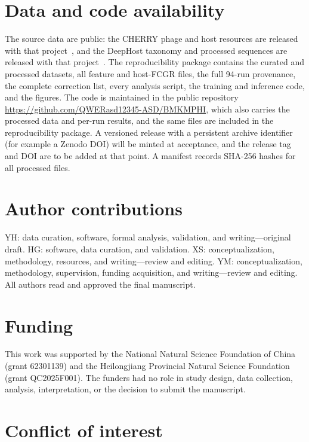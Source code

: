 \documentclass[utf8]{FrontiersinVancouver}
\begin{document}
\section*{Data and code availability}

The source data are public: the CHERRY phage and host resources are released with that project~\citep{shang2022cherry}, and the DeepHost taxonomy and processed sequences are released with that project~\citep{wang2022deephost}. The reproducibility package contains the curated and processed datasets, all feature and host-FCGR files, the full 94-run provenance, the complete correction list, every analysis script, the training and inference code, and the figures. The code is maintained in the public repository \url{https://github.com/QWERasd12345-ASD/BMKMPHI}, which also carries the processed data and per-run results, and the same files are included in the reproducibility package. A versioned release with a persistent archive identifier (for example a Zenodo DOI) will be minted at acceptance, and the release tag and DOI are to be added at that point. A manifest records SHA-256 hashes for all processed files.

\section*{Author contributions}

YH: data curation, software, formal analysis, validation, and writing---original draft. HG: software, data curation, and validation. XS: conceptualization, methodology, resources, and writing---review and editing. YM: conceptualization, methodology, supervision, funding acquisition, and writing---review and editing. All authors read and approved the final manuscript.

\section*{Funding}

This work was supported by the National Natural Science Foundation of China (grant 62301139) and the Heilongjiang Provincial Natural Science Foundation (grant QC2025F001). The funders had no role in study design, data collection, analysis, interpretation, or the decision to submit the manuscript.

\section*{Conflict of interest}
\end{document}
